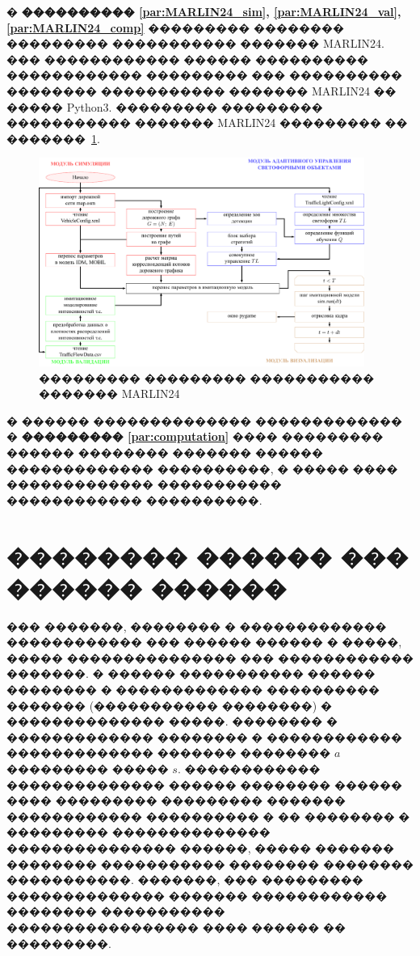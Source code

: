 \documentclass[11pt]{ubs}
\begin{document}
� \textbf{���������� \ref{par:MARLIN24_sim}, \ref{par:MARLIN24_val}, \ref{par:MARLIN24_comp}} ��������� ��������  ��������� ����������� ������� MARLIN24.
��� ������������ ������ ���������� ������������ ��������� ��� ���������� �������� ����������� ������� MARLIN24 �� ����� Python3.
��������� ��������� ����������� ������� MARLIN24 ��������� �� �������~\ref{fig:structure_MARLIN24}.
\begin{figure}[tbph]
  \centering
  \includegraphics[width=0.95\textwidth]{structure}
  \caption{��������� ��������� ����������� ������� MARLIN24}\label{fig:structure_MARLIN24}
\end{figure}


� ������ �������������� �������������  � \textbf{��������� \ref{par:computation}} ���� ��������� ������ �������� ������� ������ ������������� ����������, � ����� ���� ������������� ����������� ������������ ����������.






\section{�������� ������ ��� ������ ������}
\label{par:MARL_description}


��� �������, �������� � ������������� ������������ ��� ������ ������ � �����, ����� ��������������� ��� ������������ �������. � ������ ����������� ������ �������� � ������������� ���������� ������� (����������� ��������) � �������������� �����. �������� � ������������� �������� � ������������ ������������� ������� �������� $a$ ��������� ����� $s$. ������������ �������������� ������ �������� ������ ���� ��������� ��������� ������� ������������ ���������� � �� �������� � ��������� �������������� ��������������� ������, ����� ������� �������� ����������� �������� �������� �����������. �������, ��� ��������� �������������� ������� ������������ �������� ����������� ����������������� ���� ������ �� ���������.
\end{document}
